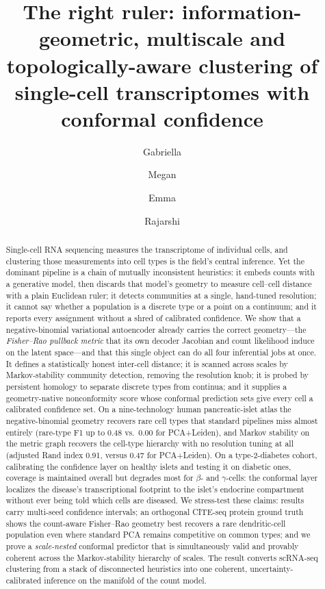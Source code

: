 \documentclass[11pt]{article}
\title{\vspace{-1.2cm}\bfseries The right ruler: information-geometric, multiscale and
topologically-aware clustering of single-cell transcriptomes with conformal confidence}
\author[1]{Gabriella \and Megan \and Emma \and Rajarshi}
\affil[1]{Carnegie Mellon University Pre-College Computational Biology Program}
\date{}
\newcommand{\panrlat}{0.48}     %
\newcommand{\panrpca}{0.00}     %
\newcommand{\markovari}{0.91}   %
\newcommand{\pcaari}{0.47}      %
\begin{document}
\maketitle
\vspace{-0.8cm}

\begin{abstract}
\noindent Single-cell RNA sequencing measures the transcriptome of individual cells, and
clustering those measurements into cell types is the field's central inference. Yet the
dominant pipeline is a chain of mutually inconsistent heuristics: it embeds counts with a
generative model, then discards that model's geometry to measure cell--cell distance with a
plain Euclidean ruler; it detects communities at a single, hand-tuned resolution; it cannot
say whether a population is a discrete type or a point on a continuum; and it reports every
assignment without a shred of calibrated confidence. We show that a negative-binomial
variational autoencoder already carries the correct geometry---the \emph{Fisher--Rao pullback
metric} that its own decoder Jacobian and count likelihood induce on the latent space---and
that this single object can do all four inferential jobs at once. It defines a
statistically honest inter-cell distance; it is scanned across scales by Markov-stability
community detection, removing the resolution knob; it is probed by persistent homology to
separate discrete types from continua; and it supplies a geometry-native nonconformity score
whose conformal prediction sets give every cell a calibrated confidence set. On a nine-technology
human pancreatic-islet atlas the negative-binomial geometry recovers rare cell types that standard
pipelines miss almost entirely (rare-type F1 up to \panrlat{} vs.\ \panrpca{} for PCA+Leiden), and
Markov stability on the metric graph recovers the cell-type hierarchy with no resolution tuning at
all (adjusted Rand index \markovari{}, versus \pcaari{} for PCA+Leiden). On a
type-2-diabetes cohort, calibrating the confidence layer on healthy islets and testing it on
diabetic ones, coverage is maintained overall but degrades most for $\beta$- and $\gamma$-cells:
the conformal layer localizes the disease's transcriptional footprint to the islet's endocrine
compartment without ever being told which cells are diseased. We stress-test these claims: results
carry multi-seed confidence intervals; an orthogonal CITE-seq protein ground truth shows the
count-aware Fisher--Rao geometry best recovers a rare dendritic-cell population even where standard PCA
remains competitive on common types; and we prove a \emph{scale-nested} conformal predictor that is
simultaneously valid and provably coherent across the Markov-stability hierarchy of scales. The result
converts scRNA-seq clustering from a stack of disconnected heuristics into one coherent,
uncertainty-calibrated inference on the manifold of the count model.
\end{abstract}
\end{document}
